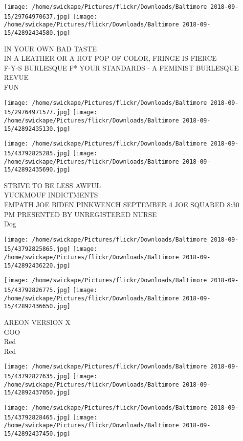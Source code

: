 \documentclass[10pt,letterpaper]{article}
\begin{document}
\texttt{[image: /home/swickape/Pictures/flickr/Downloads/Baltimore 2018-09-15/29764970637.jpg]}
\texttt{[image: /home/swickape/Pictures/flickr/Downloads/Baltimore 2018-09-15/42892434580.jpg]}

IN YOUR OWN BAD TASTE\\
IN A LEATHER OR A HOT POP OF COLOR, FRINGE IS FIERCE\\
F{-}Y{-}S BURLESQUE F* YOUR STANDARDS {-} A FEMINIST BURLESQUE REVUE\\
FUN\\
\pagebreak

\texttt{[image: /home/swickape/Pictures/flickr/Downloads/Baltimore 2018-09-15/29764971577.jpg]}
\texttt{[image: /home/swickape/Pictures/flickr/Downloads/Baltimore 2018-09-15/42892435130.jpg]}

\texttt{[image: /home/swickape/Pictures/flickr/Downloads/Baltimore 2018-09-15/43792825285.jpg]}
\texttt{[image: /home/swickape/Pictures/flickr/Downloads/Baltimore 2018-09-15/42892435690.jpg]}

STRIVE TO BE LESS AWFUL\\
YUCKMOUF INDICTMENTS\\
EMPATH JOE BIDEN PINKWENCH SEPTEMBER 4 JOE SQUARED 8:30 PM PRESENTED BY UNREGISTERED NURSE\\
Dog\\
\pagebreak

\texttt{[image: /home/swickape/Pictures/flickr/Downloads/Baltimore 2018-09-15/43792825865.jpg]}
\texttt{[image: /home/swickape/Pictures/flickr/Downloads/Baltimore 2018-09-15/42892436220.jpg]}

\texttt{[image: /home/swickape/Pictures/flickr/Downloads/Baltimore 2018-09-15/43792826775.jpg]}
\texttt{[image: /home/swickape/Pictures/flickr/Downloads/Baltimore 2018-09-15/42892436650.jpg]}

AREON VERSION X\\
GOO\\
Red\\
Red\\
\pagebreak

\texttt{[image: /home/swickape/Pictures/flickr/Downloads/Baltimore 2018-09-15/43792827635.jpg]}
\texttt{[image: /home/swickape/Pictures/flickr/Downloads/Baltimore 2018-09-15/42892437050.jpg]}

\texttt{[image: /home/swickape/Pictures/flickr/Downloads/Baltimore 2018-09-15/43792828465.jpg]}
\texttt{[image: /home/swickape/Pictures/flickr/Downloads/Baltimore 2018-09-15/42892437450.jpg]}
\end{document}
